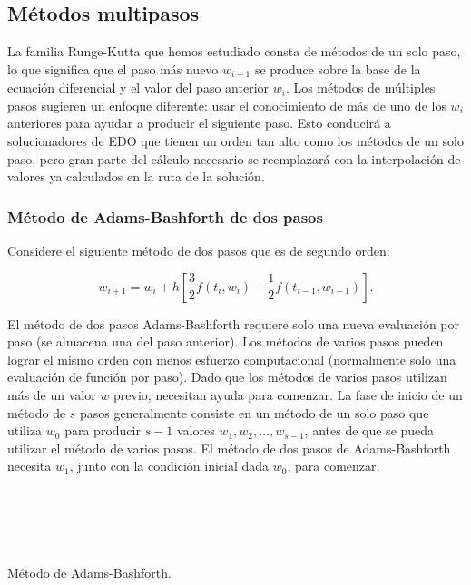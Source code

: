\subsection{Métodos multipasos}

La familia Runge-Kutta que hemos estudiado consta de métodos de un
solo paso, lo que significa que el paso más nuevo $w_{i+1}$ se
produce sobre la base de la ecuación diferencial y el valor del paso
anterior $w_{i}$.
Los métodos de múltiples pasos sugieren un enfoque diferente: usar el
conocimiento de más de uno de los $w_{i}$ anteriores para ayudar a
producir el siguiente paso.
Esto conducirá a solucionadores de EDO que tienen un orden tan alto
como los métodos de un solo paso, pero gran parte del cálculo
necesario se reemplazará con la interpolación de valores ya
calculados en la ruta de la solución.

\subsubsection{Método de Adams-Bashforth de dos pasos}

Considere el siguiente método de dos pasos que es de segundo orden:

\begin{equation*}
    w_{i+1}=
    w_{i}+h\left[\frac{3}{2}f\left(t_{i},w_{i}\right)-\frac{1}{2}f\left(t_{i-1},w_{i-1}\right)\right].
\end{equation*}

El método de dos pasos Adams-Bashforth requiere solo una nueva
evaluación por paso (se almacena una del paso anterior).
Los métodos de varios pasos pueden lograr el mismo orden con menos
esfuerzo computacional (normalmente solo una evaluación de función por paso).
Dado que los métodos de varios pasos utilizan más de un valor $w$
previo, necesitan ayuda para comenzar.
La fase de inicio de un método de $s$ pasos generalmente consiste en
un método de un solo paso que utiliza $w_{0}$ para producir $s-1$
valores $w_{1},w_{2},\dotsc,w_{s−1}$, antes de que se pueda utilizar
el método de varios pasos.
El método de dos pasos de Adams-Bashforth necesita $w_{1}$, junto con
la condición inicial dada $w_{0}$, para comenzar.

\begin{listing}[ht!]
    \tiny
    \centering
    \inputminted[linenos,highlightlines={7-24}]{octave}{exmultistep.m}
    \inputminted[linenos,highlightlines={1-8}]{octave}{trapstep.m}
    \inputminted[linenos,highlightlines={1-5}]{octave}{ab2step.m}
    \inputminted[linenos,highlightlines={1-5}]{octave}{unstable2step.m}
    \inputminted[linenos,highlightlines={1-5}]{octave}{weaklystable2step.m}
    \inputminted[linenos,highlightlines={1-4}]{octave}{ydot.m}
    \caption{Método de Adams-Bashforth.}
\end{listing}

